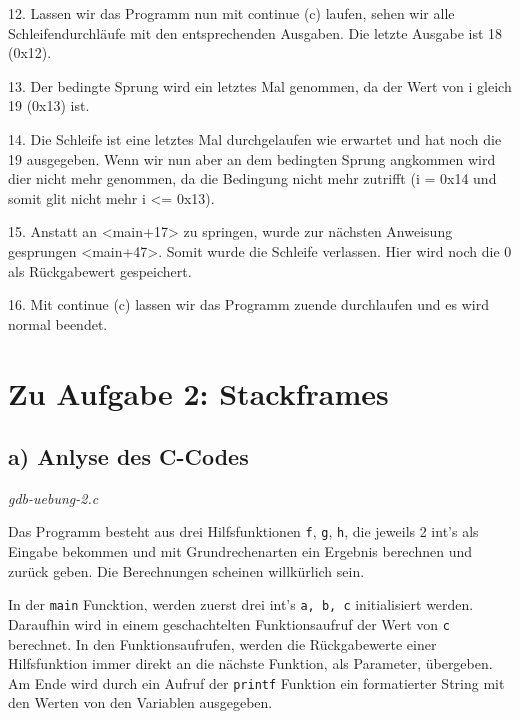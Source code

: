 \documentclass[12pt]{article}
\begin{document}

12. Lassen wir das Programm nun mit continue (c) laufen, sehen wir alle Schleifendurchläufe mit den entsprechenden Ausgaben. Die letzte Ausgabe ist 18 (0x12).


13. Der bedingte Sprung wird ein letztes Mal genommen, da der Wert von i gleich 19 (0x13) ist.


14. Die Schleife ist eine letztes Mal durchgelaufen wie erwartet und hat noch die 19 ausgegeben. Wenn wir nun aber an dem bedingten Sprung angkommen wird dier nicht mehr genommen, da die Bedingung nicht mehr zutrifft (i = 0x14 und somit glit nicht mehr i <= 0x13).


15. Anstatt an <main+17> zu springen, wurde zur nächsten Anweisung gesprungen <main+47>. Somit wurde die Schleife verlassen. Hier wird noch die 0 als Rückgabewert gespeichert. 


16. Mit continue (c) lassen wir das Programm zuende durchlaufen und es wird normal beendet.


\section{Zu Aufgabe 2: Stackframes}
\subsection{a) Anlyse des C-Codes}

\textit{gdb-uebung-2.c}



Das Programm besteht aus drei Hilfsfunktionen \texttt{f}, \texttt{g}, \texttt{h}, die jeweils 2 int's als Eingabe bekommen und mit Grundrechenarten ein Ergebnis berechnen und zurück geben. Die Berechnungen scheinen willkürlich sein. 

In der \texttt{main} Funcktion, werden zuerst drei int's \texttt{a, b, c} initialisiert werden. Daraufhin wird in einem geschachtelten Funktionsaufruf der Wert von \texttt{c} berechnet. In den Funktionsaufrufen, werden die Rückgabewerte einer Hilfsfunktion immer direkt an die nächste Funktion, als Parameter, übergeben. Am Ende wird durch ein Aufruf der \texttt{printf} Funktion ein formatierter String mit den Werten von den Variablen ausgegeben.
\end{document}
